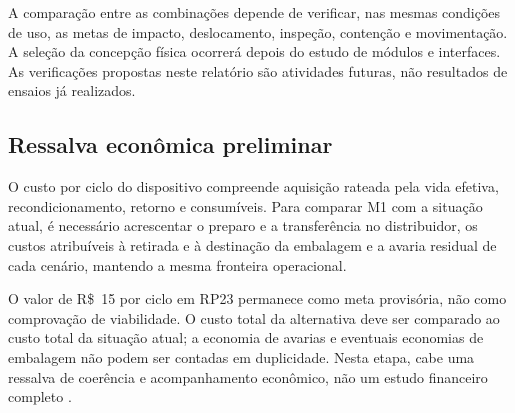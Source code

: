 A comparação entre as combinações depende de verificar, nas mesmas condições de uso, as metas de impacto, deslocamento, inspeção, contenção e movimentação. A seleção da concepção física ocorrerá depois do estudo de módulos e interfaces. As verificações propostas neste relatório são atividades futuras, não resultados de ensaios já realizados.

\subsection{Ressalva econômica preliminar}
O custo por ciclo do dispositivo compreende aquisição rateada pela vida efetiva, recondicionamento, retorno e consumíveis. Para comparar M1 com a situação atual, é necessário acrescentar o preparo e a transferência no distribuidor, os custos atribuíveis à retirada e à destinação da embalagem e a avaria residual de cada cenário, mantendo a mesma fronteira operacional.

O valor de R\$~15 por ciclo em RP23 permanece como meta provisória, não como comprovação de viabilidade. O custo total da alternativa deve ser comparado ao custo total da situação atual; a economia de avarias e eventuais economias de embalagem não podem ser contadas em duplicidade. Nesta etapa, cabe uma ressalva de coerência e acompanhamento econômico, não um estudo financeiro completo \citep[pp.~339--340]{back2008}.
